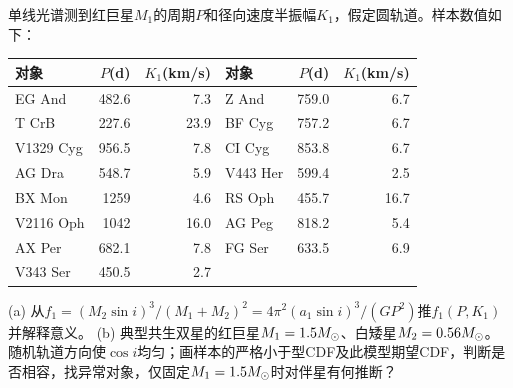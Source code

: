 \begin{exercise}
单线光谱测到红巨星$M_1$的周期$P$和径向速度半振幅$K_1$，假定圆轨道。样本数值如下：
\begin{center}\begin{tabular}{lrrlrr}\toprule
对象&$P$(d)&$K_1$(km/s)&对象&$P$(d)&$K_1$(km/s)\\\midrule
EG And&482.6&7.3&Z And&759.0&6.7\\
T CrB&227.6&23.9&BF Cyg&757.2&6.7\\
V1329 Cyg&956.5&7.8&CI Cyg&853.8&6.7\\
AG Dra&548.7&5.9&V443 Her&599.4&2.5\\
BX Mon&1259&4.6&RS Oph&455.7&16.7\\
V2116 Oph&1042&16.0&AG Peg&818.2&5.4\\
AX Per&682.1&7.8&FG Ser&633.5&6.9\\
V343 Ser&450.5&2.7&&&\\\bottomrule
\end{tabular}\end{center}
(a) 从$f_1=(M_2\sin i)^3/(M_1+M_2)^2=4\pi^2(a_1\sin i)^3/(GP^2)$推$f_1(P,K_1)$并解释意义。
(b) 典型共生双星的红巨星$M_1=1.5M_{\odot}$、白矮星$M_2=0.56M_{\odot}$。随机轨道方向使$\cos i$均匀；画样本的严格小于型CDF及此模型期望CDF，判断是否相容，找异常对象，仅固定$M_1=1.5M_{\odot}$时对伴星有何推断？
\end{exercise}
